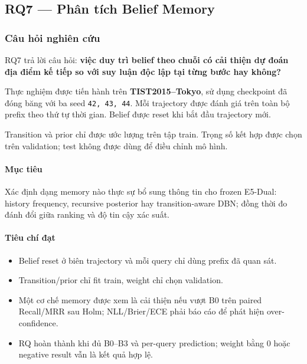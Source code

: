 \subsection{RQ7 --- Phân tích Belief Memory}

\subsubsection*{Câu hỏi nghiên cứu}

RQ7 trả lời câu hỏi: \textbf{việc duy trì belief theo chuỗi có cải thiện dự đoán địa điểm kế tiếp so với suy luận độc lập tại từng bước hay không?}

Thực nghiệm được tiến hành trên \textbf{TIST2015--Tokyo}, sử dụng checkpoint  đã đóng băng với ba seed \texttt{42, 43, 44}. Mỗi trajectory được đánh giá trên toàn bộ prefix theo thứ tự thời gian. Belief được reset khi bắt đầu trajectory mới.

Transition và prior chỉ được ước lượng trên tập train. Trọng số kết hợp được chọn trên validation; test không được dùng để điều chỉnh mô hình.

\paragraph{Mục tiêu}

Xác định dạng memory nào thực sự bổ sung thông tin cho frozen E5-Dual: history frequency, recursive posterior hay transition-aware DBN; đồng thời đo đánh đổi giữa ranking và độ tin cậy xác suất.

\paragraph{Tiêu chí đạt}

\begin{itemize}
\item Belief reset ở biên trajectory và mỗi query chỉ dùng prefix đã quan sát.
\item Transition/prior chỉ fit train, weight chỉ chọn validation.
\item Một cơ chế memory được xem là cải thiện nếu vượt B0 trên paired Recall/MRR
sau Holm; NLL/Brier/ECE phải báo cáo để phát hiện over-confidence.

\item RQ hoàn thành khi đủ B0--B3 và per-query prediction; weight bằng 0 hoặc negative
result vẫn là kết quả hợp lệ.

\end{itemize}

